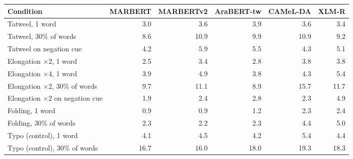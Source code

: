 \begin{tabular}{lrrrrr}
\toprule
Condition & MARBERT & MARBERTv2 & AraBERT-tw & CAMeL-DA & XLM-R \\
\midrule
Tatweel, 1 word & 3.0 & 3.6 & 3.9 & 3.6 & 3.4 \\
Tatweel, 30\% of words & 8.6 & 10.9 & 9.9 & 10.9 & 9.2 \\
Tatweel on negation cue & 4.2 & 5.9 & 5.5 & 4.3 & 5.1 \\
Elongation $\times$2, 1 word & 2.5 & 3.4 & 2.8 & 3.8 & 3.8 \\
Elongation $\times$4, 1 word & 3.9 & 4.9 & 3.8 & 4.3 & 5.4 \\
Elongation $\times$2, 30\% of words & 9.7 & 11.1 & 8.9 & 15.7 & 11.7 \\
Elongation $\times$2 on negation cue & 1.9 & 2.4 & 2.8 & 2.3 & 4.9 \\
Folding, 1 word & 0.9 & 0.9 & 1.2 & 2.3 & 2.4 \\
Folding, 30\% of words & 2.3 & 2.2 & 2.3 & 4.4 & 5.0 \\
Typo (control), 1 word & 4.1 & 4.5 & 4.2 & 5.4 & 4.4 \\
Typo (control), 30\% of words & 16.7 & 16.0 & 18.0 & 19.3 & 18.3 \\
\bottomrule
\end{tabular}

